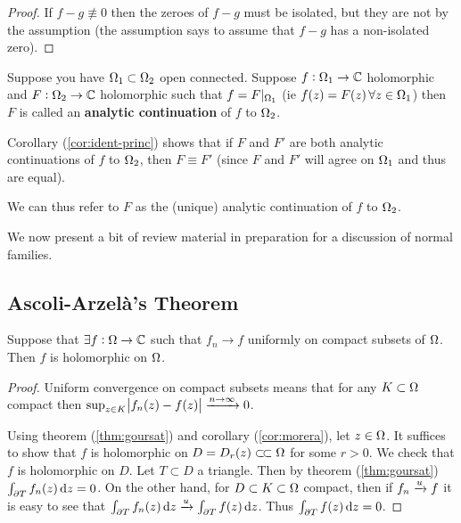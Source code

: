 \begin{proof}
If $f-g \not\equiv 0$ then the zeroes of $f-g$ must be isolated, but they are not by the assumption (the assumption says to assume that $f-g$ has a non-isolated zero).
\end{proof}

\begin{definition}
Suppose you have $\Omega_1 \subset \Omega_2 $ open connected. Suppose $f: \Omega_1 \to \mathbb{C}$ holomorphic and $F: \Omega_2 \to \mathbb{C}$ holomorphic such that $f = F |_{\Omega_1}$ (ie $f(z) = F(z) \, \forall z \in \Omega_1$) then $F$ is called an \textbf{analytic continuation} of $f$ to $\Omega_2$.

\end{definition}


\begin{note}

Corollary (\ref{cor:ident-princ}) shows that if $F$ and $F'$ are both analytic continuations of $f$ to $\Omega_2$, then $F \equiv F'$ (since $F$ and $F'$ will agree on $\Omega_1$ and thus are equal).

We can thus refer to $F$ as the (unique) analytic continuation of $f$ to $\Omega_2$.
\end{note}

We now present a bit of review material in preparation for a discussion of normal families.

\subsection{Ascoli-Arzelà's Theorem}

\begin{proposition}
Suppose that $\exists f:\Omega \rightarrow \mathbb{C}$ such that $f_n \to f$ uniformly on compact subsets of $\Omega$. Then $f$ is holomorphic on $\Omega$.
\end{proposition}


\begin{proof}
Uniform convergence on compact subsets means that for any $K \subset \Omega$ compact then $\sup_{z\in K} \abs{f_n(z) - f(z)} \xrightarrow[]{n \to \infty} 0$. 

Using theorem (\ref{thm:goursat}) and corollary (\ref{cor:morera}), let $z\in \Omega$. It suffices to show that $f$ is holomorphic on $D=D_r(z) \ssubset \om $ for some $r>0$. We check that $f$ is holomorphic on $D$. Let $T \subset D$ a triangle. Then by theorem (\ref{thm:goursat}) $\int_{\partial T} f_n(z) \dif z =  0$. On the other hand, for $D \subset K \subset \Omega$ compact, then if $f_n \xrightarrow[]{u} f$ it is easy to see that $\int_{\partial T} f_n(z) \dif z \tou \int_{\partial T} f(z) \dif z$. Thus $\int_{\partial T} f(z) \dif z = 0$.
\end{proof}

